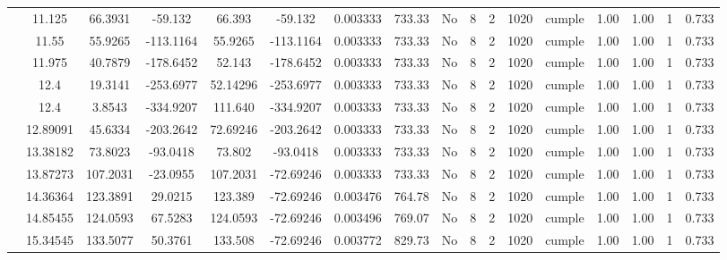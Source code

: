 \begin{table}[H]
{\begin{tabular}{|c|c|c|c|c|c|c|c|c|c|c|c|c|c|c|c|c|}
\cline{2-17}        & 11.125 & 66.3931 & -59.132 & 66.393 & -59.132 & 0.003333 & 733.33 & No  & 8   & 2   & 1020 & \cellcolor[rgb]{ .776,  .937,  .808}cumple & 1.00 & 1.00 & 1   & 0.733 \bigstrut\\
\cline{2-17}        & 11.55 & 55.9265 & -113.1164 & 55.9265 & -113.1164 & 0.003333 & 733.33 & No  & 8   & 2   & 1020 & \cellcolor[rgb]{ .776,  .937,  .808}cumple & 1.00 & 1.00 & 1   & 0.733 \bigstrut\\
\cline{2-17}        & 11.975 & 40.7879 & -178.6452 & 52.143 & -178.6452 & 0.003333 & 733.33 & No  & 8   & 2   & 1020 & \cellcolor[rgb]{ .776,  .937,  .808}cumple & 1.00 & 1.00 & 1   & 0.733 \bigstrut\\
\cline{2-17}        & \cellcolor[rgb]{ .851,  .882,  .949}12.4 & 19.3141 & -253.6977 & 52.14296 & -253.6977 & 0.003333 & 733.33 & No  & 8   & 2   & 1020 & \cellcolor[rgb]{ .776,  .937,  .808}cumple & 1.00 & 1.00 & 1   & 0.733 \bigstrut\\
\cline{2-17}        & \cellcolor[rgb]{ .851,  .882,  .949}12.4 & 3.8543 & -334.9207 & 111.640 & -334.9207 & 0.003333 & 733.33 & No  & 8   & 2   & 1020 & \cellcolor[rgb]{ .776,  .937,  .808}cumple & 1.00 & 1.00 & 1   & 0.733 \bigstrut\\
\cline{2-17}        & 12.89091 & 45.6334 & -203.2642 & 72.69246 & -203.2642 & 0.003333 & 733.33 & No  & 8   & 2   & 1020 & \cellcolor[rgb]{ .776,  .937,  .808}cumple & 1.00 & 1.00 & 1   & 0.733 \bigstrut\\
\cline{2-17}        & 13.38182 & 73.8023 & -93.0418 & 73.802 & -93.0418 & 0.003333 & 733.33 & No  & 8   & 2   & 1020 & \cellcolor[rgb]{ .776,  .937,  .808}cumple & 1.00 & 1.00 & 1   & 0.733 \bigstrut\\
\cline{2-17}        & 13.87273 & 107.2031 & -23.0955 & 107.2031 & -72.69246 & 0.003333 & 733.33 & No  & 8   & 2   & 1020 & \cellcolor[rgb]{ .776,  .937,  .808}cumple & 1.00 & 1.00 & 1   & 0.733 \bigstrut\\
\cline{2-17}        & 14.36364 & 123.3891 & 29.0215 & 123.389 & -72.69246 & 0.003476 & 764.78 & No  & 8   & 2   & 1020 & \cellcolor[rgb]{ .776,  .937,  .808}cumple & 1.00 & 1.00 & 1   & 0.733 \bigstrut\\
\cline{2-17}        & 14.85455 & 124.0593 & 67.5283 & 124.0593 & -72.69246 & 0.003496 & 769.07 & No  & 8   & 2   & 1020 & \cellcolor[rgb]{ .776,  .937,  .808}cumple & 1.00 & 1.00 & 1   & 0.733 \bigstrut\\
\cline{2-17}        & 15.34545 & 133.5077 & 50.3761 & 133.508 & -72.69246 & 0.003772 & 829.73 & No  & 8   & 2   & 1020 & \cellcolor[rgb]{ .776,  .937,  .808}cumple & 1.00 & 1.00 & 1   & 0.733 \bigstrut\\

\end{tabular}}
\end{table}

